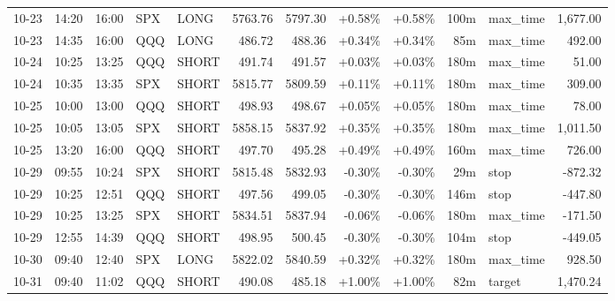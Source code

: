 \documentclass[11pt,a4paper,twoside]{article}
\begin{document}
\begin{center}
\begin{longtable}{>{\color{txtmain}}l l l l l r r r r r >{\color{txtmain}}l r}
10-23 & 14:20 & 16:00 & SPX & LONG & 5763.76 & 5797.30 & \textcolor{wingreen}{+0.58\%} & \textcolor{wingreen}{+0.58\%} & 100m & max\_time & \textcolor{wingreen}{1,677.00} \\
10-23 & 14:35 & 16:00 & QQQ & LONG & 486.72 & 488.36 & \textcolor{wingreen}{+0.34\%} & \textcolor{wingreen}{+0.34\%} & 85m & max\_time & \textcolor{wingreen}{492.00} \\
10-24 & 10:25 & 13:25 & QQQ & SHORT & 491.74 & 491.57 & \textcolor{wingreen}{+0.03\%} & \textcolor{wingreen}{+0.03\%} & 180m & max\_time & \textcolor{wingreen}{51.00} \\
10-24 & 10:35 & 13:35 & SPX & SHORT & 5815.77 & 5809.59 & \textcolor{wingreen}{+0.11\%} & \textcolor{wingreen}{+0.11\%} & 180m & max\_time & \textcolor{wingreen}{309.00} \\
10-25 & 10:00 & 13:00 & QQQ & SHORT & 498.93 & 498.67 & \textcolor{wingreen}{+0.05\%} & \textcolor{wingreen}{+0.05\%} & 180m & max\_time & \textcolor{wingreen}{78.00} \\
10-25 & 10:05 & 13:05 & SPX & SHORT & 5858.15 & 5837.92 & \textcolor{wingreen}{+0.35\%} & \textcolor{wingreen}{+0.35\%} & 180m & max\_time & \textcolor{wingreen}{1,011.50} \\
10-25 & 13:20 & 16:00 & QQQ & SHORT & 497.70 & 495.28 & \textcolor{wingreen}{+0.49\%} & \textcolor{wingreen}{+0.49\%} & 160m & max\_time & \textcolor{wingreen}{726.00} \\
10-29 & 09:55 & 10:24 & SPX & SHORT & 5815.48 & 5832.93 & \textcolor{lossred}{-0.30\%} & \textcolor{lossred}{-0.30\%} & 29m & stop & \textcolor{lossred}{-872.32} \\
10-29 & 10:25 & 12:51 & QQQ & SHORT & 497.56 & 499.05 & \textcolor{lossred}{-0.30\%} & \textcolor{lossred}{-0.30\%} & 146m & stop & \textcolor{lossred}{-447.80} \\
10-29 & 10:25 & 13:25 & SPX & SHORT & 5834.51 & 5837.94 & \textcolor{lossred}{-0.06\%} & \textcolor{lossred}{-0.06\%} & 180m & max\_time & \textcolor{lossred}{-171.50} \\
10-29 & 12:55 & 14:39 & QQQ & SHORT & 498.95 & 500.45 & \textcolor{lossred}{-0.30\%} & \textcolor{lossred}{-0.30\%} & 104m & stop & \textcolor{lossred}{-449.05} \\
10-30 & 09:40 & 12:40 & SPX & LONG & 5822.02 & 5840.59 & \textcolor{wingreen}{+0.32\%} & \textcolor{wingreen}{+0.32\%} & 180m & max\_time & \textcolor{wingreen}{928.50} \\
10-31 & 09:40 & 11:02 & QQQ & SHORT & 490.08 & 485.18 & \textcolor{wingreen}{+1.00\%} & \textcolor{wingreen}{+1.00\%} & 82m & target & \textcolor{wingreen}{1,470.24} \\

\end{longtable}
\end{center}
\end{document}
